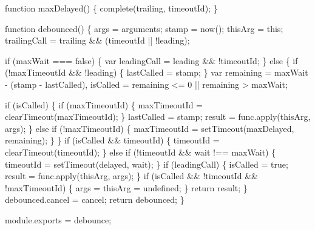 \begin{DoxyCodeInclude}
  \textcolor{keyword}{function} maxDelayed() \{
    complete(trailing, timeoutId);
  \}

  \textcolor{keyword}{function} debounced() \{
    args = arguments;
    stamp = now();
    thisArg = \textcolor{keyword}{this};
    trailingCall = trailing && (timeoutId || !leading);

    \textcolor{keywordflow}{if} (maxWait === \textcolor{keyword}{false}) \{
      var leadingCall = leading && !timeoutId;
    \} \textcolor{keywordflow}{else} \{
      \textcolor{keywordflow}{if} (!maxTimeoutId && !leading) \{
        lastCalled = stamp;
      \}
      var remaining = maxWait - (stamp - lastCalled),
          isCalled = remaining <= 0 || remaining > maxWait;

      \textcolor{keywordflow}{if} (isCalled) \{
        \textcolor{keywordflow}{if} (maxTimeoutId) \{
          maxTimeoutId = clearTimeout(maxTimeoutId);
        \}
        lastCalled = stamp;
        result = func.apply(thisArg, args);
      \}
      \textcolor{keywordflow}{else} \textcolor{keywordflow}{if} (!maxTimeoutId) \{
        maxTimeoutId = setTimeout(maxDelayed, remaining);
      \}
    \}
    \textcolor{keywordflow}{if} (isCalled && timeoutId) \{
      timeoutId = clearTimeout(timeoutId);
    \}
    \textcolor{keywordflow}{else} \textcolor{keywordflow}{if} (!timeoutId && wait !== maxWait) \{
      timeoutId = setTimeout(delayed, wait);
    \}
    \textcolor{keywordflow}{if} (leadingCall) \{
      isCalled = \textcolor{keyword}{true};
      result = func.apply(thisArg, args);
    \}
    \textcolor{keywordflow}{if} (isCalled && !timeoutId && !maxTimeoutId) \{
      args = thisArg = undefined;
    \}
    \textcolor{keywordflow}{return} result;
  \}
  debounced.cancel = cancel;
  \textcolor{keywordflow}{return} debounced;
\}

module.exports = debounce;
\end{DoxyCodeInclude}
 